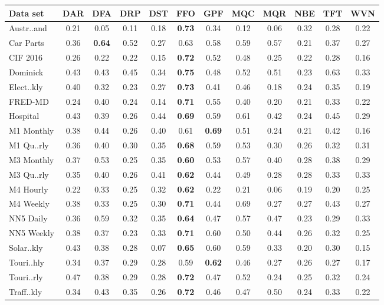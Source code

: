 
    \begin{tabular}{l|ccccccccccc}
        \toprule 
        Data set & DAR & DFA & DRP & DST & FFO & GPF & MQC & MQR & NBE & TFT & WVN \\
        \midrule
        Austr..and & 0.21 & 0.05 & 0.11 & 0.18 & \textbf{0.73} & 0.34 & 0.12 & 0.06 & 0.32 & 0.28 & 0.22 \\
        Car Parts & 0.36 & \textbf{0.64} & 0.52 & 0.27 & 0.63 & 0.58 & 0.59 & 0.57 & 0.21 & 0.37 & 0.27 \\
        CIF 2016 & 0.26 & 0.22 & 0.22 & 0.15 & \textbf{0.72} & 0.52 & 0.48 & 0.25 & 0.22 & 0.28 & 0.16 \\
        Dominick & 0.43 & 0.43 & 0.45 & 0.34 & \textbf{0.75} & 0.48 & 0.52 & 0.51 & 0.23 & 0.63 & 0.33 \\
        Elect..kly & 0.40 & 0.32 & 0.23 & 0.27 & \textbf{0.73} & 0.41 & 0.46 & 0.18 & 0.24 & 0.35 & 0.19 \\
        FRED-MD & 0.24 & 0.40 & 0.24 & 0.14 & \textbf{0.71} & 0.55 & 0.40 & 0.20 & 0.21 & 0.33 & 0.22 \\
        Hospital & 0.43 & 0.39 & 0.26 & 0.44 & \textbf{0.69} & 0.59 & 0.61 & 0.42 & 0.24 & 0.45 & 0.29 \\
        M1 Monthly & 0.38 & 0.44 & 0.26 & 0.40 & 0.61 & \textbf{0.69} & 0.51 & 0.24 & 0.21 & 0.42 & 0.16 \\
        M1 Qu..rly & 0.36 & 0.40 & 0.30 & 0.35 & \textbf{0.68} & 0.59 & 0.53 & 0.30 & 0.26 & 0.32 & 0.31 \\
        M3 Monthly & 0.37 & 0.53 & 0.25 & 0.35 & \textbf{0.60} & 0.53 & 0.57 & 0.40 & 0.28 & 0.38 & 0.29 \\
        M3 Qu..rly & 0.35 & 0.40 & 0.26 & 0.41 & \textbf{0.62} & 0.44 & 0.49 & 0.28 & 0.28 & 0.33 & 0.33 \\
        M4 Hourly & 0.22 & 0.33 & 0.25 & 0.32 & \textbf{0.62} & 0.22 & 0.21 & 0.06 & 0.19 & 0.20 & 0.25 \\
        M4 Weekly & 0.38 & 0.33 & 0.25 & 0.30 & \textbf{0.71} & 0.44 & 0.69 & 0.27 & 0.27 & 0.43 & 0.27 \\
        NN5 Daily & 0.36 & 0.59 & 0.32 & 0.35 & \textbf{0.64} & 0.47 & 0.57 & 0.47 & 0.23 & 0.29 & 0.33 \\
        NN5 Weekly & 0.38 & 0.37 & 0.23 & 0.33 & \textbf{0.71} & 0.60 & 0.50 & 0.44 & 0.26 & 0.32 & 0.25 \\
        Solar..kly & 0.43 & 0.38 & 0.28 & 0.07 & \textbf{0.65} & 0.60 & 0.59 & 0.33 & 0.20 & 0.30 & 0.15 \\
        Touri..hly & 0.34 & 0.37 & 0.29 & 0.28 & 0.59 & \textbf{0.62} & 0.46 & 0.27 & 0.26 & 0.27 & 0.17 \\
        Touri..rly & 0.47 & 0.38 & 0.29 & 0.28 & \textbf{0.72} & 0.47 & 0.52 & 0.24 & 0.25 & 0.32 & 0.24 \\
        Traff..kly & 0.34 & 0.43 & 0.35 & 0.26 & \textbf{0.72} & 0.46 & 0.47 & 0.50 & 0.24 & 0.33 & 0.22 \\
        \bottomrule
    \end{tabular}
